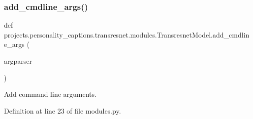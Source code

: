\subsubsection{\texorpdfstring{add\+\_\+cmdline\+\_\+args()}{add\_cmdline\_args()}}
{\footnotesize\ttfamily def projects.\+personality\+\_\+captions.\+transresnet.\+modules.\+Transresnet\+Model.\+add\+\_\+cmdline\+\_\+args (\begin{DoxyParamCaption}\item[{}]{argparser }\end{DoxyParamCaption})\hspace{0.3cm}{\ttfamily [static]}}

\begin{DoxyVerb}Add command line arguments.
\end{DoxyVerb}
 

Definition at line 23 of file modules.\+py.


